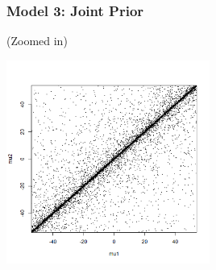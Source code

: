 \documentclass{beamer}
\begin{document}
\begin{frame}[fragile]
\frametitle{Model 3: Joint Prior}
(Zoomed in)
\begin{center}
\includegraphics[width=0.5\textwidth]{images/ttest_prior3.png}
\end{center}

\end{frame}
\end{document}
